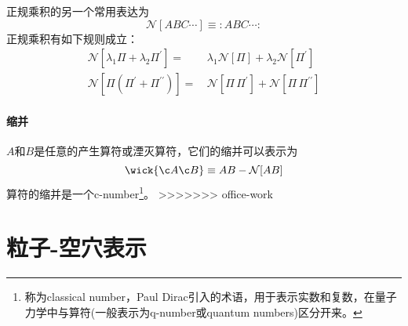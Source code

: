 正规乘积的另一个常用表达为
\begin{equation}
    \mathcal{N}[ABC\cdots] \equiv :ABC\cdots:
\end{equation}
正规乘积有如下规则成立：
\begin{align}
    \mathcal{N}\left[\lambda_1 \Pi + \lambda_2 \Pi^{\prime}\right]
    =&\, \lambda_1 \mathcal{N}[\Pi] + \lambda_2 \mathcal{N}\left[\Pi^{\prime}\right] \\
    \mathcal{N}\left[\Pi(\Pi^{\prime} + \Pi^{\prime\prime})\right]
    =&\, \mathcal{N}[\Pi\,\Pi^{\prime}] + \mathcal{N}\left[\Pi\,\Pi^{\prime\prime}\right]
\end{align}

\paragraph*{缩并}
$A$和$B$是任意的产生算符或湮灭算符，它们的缩并可以表示为
\begin{equation}
    \wick{\c A \c B} \equiv AB - \mathcal{N}[AB]
\end{equation}
算符的缩并是一个c-number\footnote{称为classical number，Paul Dirac引入的术语，用于表示实数和复数，在量子力学中与算符(一般表示为q-number或quantum numbers)区分开来。}。
>>>>>>> office-work

\section{粒子-空穴表示}


